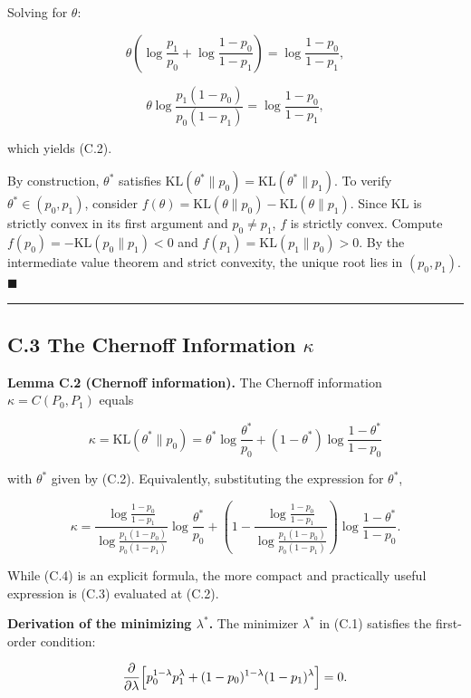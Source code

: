\documentclass[
  12pt,
]{article}
\begin{document}
Solving for \(\theta\):

\[
\theta\left(\log\frac{p_1}{p_0} + \log\frac{1-p_0}{1-p_1}\right) = \log\frac{1-p_0}{1-p_1},
\]

\[
\theta \log\frac{p_1(1-p_0)}{p_0(1-p_1)} = \log\frac{1-p_0}{1-p_1},
\]

which yields (C.2).

By construction, \(\theta^*\) satisfies
\(\text{KL}(\theta^*\|p_0) = \text{KL}(\theta^*\|p_1)\). To verify
\(\theta^* \in (p_0,p_1)\), consider
\(f(\theta) = \text{KL}(\theta\|p_0) - \text{KL}(\theta\|p_1)\). Since
KL is strictly convex in its first argument and \(p_0 \neq p_1\), \(f\)
is strictly convex. Compute \(f(p_0) = -\text{KL}(p_0\|p_1) < 0\) and
\(f(p_1) = \text{KL}(p_1\|p_0) > 0\). By the intermediate value theorem
and strict convexity, the unique root lies in \((p_0,p_1)\).
\(\blacksquare\)

\begin{center}\rule{0.5\linewidth}{0.5pt}\end{center}

\subsection{\texorpdfstring{C.3 The Chernoff Information
\(\kappa\)}{C.3 The Chernoff Information \textbackslash kappa}}\label{c.3-the-chernoff-information-kappa}

\textbf{Lemma C.2 (Chernoff information).} The Chernoff information
\(\kappa = C(P_0,P_1)\) equals

\[
\boxed{\;
\kappa = \text{KL}(\theta^*\|p_0)
= \theta^*\log\frac{\theta^*}{p_0} + (1-\theta^*)\log\frac{1-\theta^*}{1-p_0}
\;} \tag{C.3}
\]

with \(\theta^*\) given by (C.2). Equivalently, substituting the
expression for \(\theta^*\),

\[
\kappa = \frac{\log\frac{1-p_0}{1-p_1}}{\log\frac{p_1(1-p_0)}{p_0(1-p_1)}}
        \log\frac{\theta^*}{p_0}
        + \left(1 - \frac{\log\frac{1-p_0}{1-p_1}}{\log\frac{p_1(1-p_0)}{p_0(1-p_1)}}\right)
        \log\frac{1-\theta^*}{1-p_0}. \tag{C.4}
\]

While (C.4) is an explicit formula, the more compact and practically
useful expression is (C.3) evaluated at (C.2).

\textbf{Derivation of the minimizing \(\lambda^*\).} The minimizer
\(\lambda^*\) in (C.1) satisfies the first-order condition:

\[
\frac{\partial}{\partial\lambda}\Bigl[p_0^{1-\lambda}p_1^\lambda + (1-p_0)^{1-\lambda}(1-p_1)^\lambda\Bigr] = 0.
\]
\end{document}
